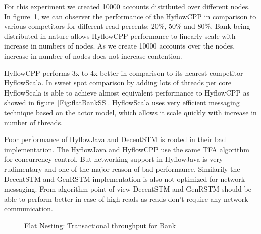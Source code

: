 \documentclass[12pt,english]{report}
\begin{document}
For this experiment we created 10000 accounts distributed over different nodes. In figure~\ref{Fig:flatBank}, we can observer the performance of the HyflowCPP in comparison to various competitors for different read percents: 20\%, 50\% and 80\%. Bank being distributed in nature allows HyflowCPP performance to linearly scale with increase in numbers of nodes. As we create 10000 accounts over the nodes, increase in number of nodes does not increase contention.

HyflowCPP performs 3x to 4x better in comparison to its nearest competitor HyflowScala. In sweet spot comparison by adding lots of threads per core HyflowScala is able to achieve almost equivalent performance to HyflowCPP as showed in figure~\ref{Fig:flatBankSS}. HyflowScala uses very efficient messaging technique based on the actor model, which allows it scale quickly with increase in number of threads.

Poor performance of HyflowJava and  DecentSTM is rooted in their bad implementation. The HyflowJava and HyflowCPP use the same TFA algorithm for concurrency control. But networking support in HyflowJava is very rudimentary and one of the major reason of bad performance. Similarily the DecentSTM and GenRSTM implementation is also not optimized for network messaging. From algorithm point of view DecentSTM and GenRSTM should be able to perform better in case of high reads as reads don't require any network communication.

\begin{figure}
\centering
{}
\end{figure}
\begin{figure}[H]
\centering
{}
\end{figure}
\begin{figure}[H]
\centering
{}
\end{figure}
\begin{figure}[H]
\centering
{}
\caption{Flat Nesting: Transactional throughput for Bank}
\label{Fig:flatBank}
\end{figure}
\end{document}
